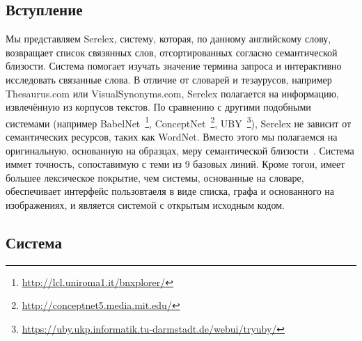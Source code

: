 \documentclass[a4paper,10pt,twoside]{article}
\begin{document}

\author{Панченко А.И.${}^{1,2}$, Романов П.В.${}^2$, Романов А.В${}^1$, \linebreak Филиппович А.Ю.${}^2$, Филиппович Ю.Н., Морозова О.Д.${}^1$}



\subsection{Вступление}

Мы представляем Serelex, систему, которая, по данному английскому слову, возвращает список связянных слов, отсортированных согласно семантической близости. Система помогает изучать значение термина запроса и интерактивно исследовать связанные слова. В отличие от словарей и тезаурусов, например Thesaurus.com или VisualSynonyms.com, Serelex полагается на информацию, извлечённую из корпусов текстов. По сравнению с другими подобными системами (например BabelNet~\footnote{ \url{http://lcl.uniroma1.it/bnxplorer/}}, ConceptNet~\footnote{ \url{http://conceptnet5.media.mit.edu/}}, UBY~\footnote{\url{https://uby.ukp.informatik.tu-darmstadt.de/webui/tryuby/}}), Serelex не зависит от семантических ресурсов, таких как WordNet. Вместо этого мы полагаемся на оригинальную, основанную на образцах, меру семантической близости~\cite{panchenko2012konvens}. Система иммет точность, сопоставимую с теми из 9 базовых линий. Кроме тогои, имеет большее лексическое покрытие, чем системы, основанные на словаре, обеспечивает интерфейс 
пользовтаеля в виде списка, графа и основанного на изображениях, и является системой с открытым исходным кодом.

\subsection{Система}
\end{document}
